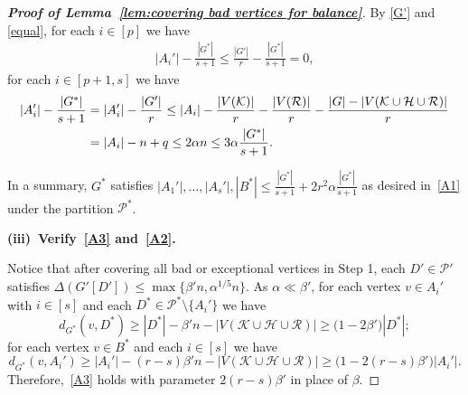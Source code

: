 \documentclass[11pt, a4paper]{article}
\theoremstyle{definition}
\newcommand{\be}{\beta}
\newcommand{\<}{\subseteq}
\newcommand{\De}{\Delta}
\begin{document}
\begin{proof}[{\bf Proof of Lemma~\ref{lem:covering bad vertices for balance}}]
By \eqref{G'} and \eqref{equal}, for each $i\in [p]$ we have 
\begin{align*}%
|A_i'|-\frac{|G^*|}{s+1}\leq \frac{|G'|}{r}- \frac{|G^*|}{s+1}=0,%
\end{align*}
for each $i\in [p+1,s]$  we have 
\begin{align}\notag
|A_i'|-\frac{|G^*|}{s+1}&=|A_i'|-\frac{|G'|}{r}\leq |A_i|-\frac{|V(\mathcal{K})|}{r}-\frac{|V(\mathcal{R})|}{r}-\frac{|G|-|V(\mathcal{K}\cup \mathcal{H}\cup \mathcal{R})|}{r}\\\notag
&=|A_i|-n+q\leq 2\alpha n\leq 3\alpha  \frac{|G^*|}{s+1}. 
\end{align}

In a summary, $G^*$ satisfies $|A_1'|,\ldots, |A_{s}'|,|B^*|\leq \frac{|G^*|}{s+1}+2r^2\alpha \frac{|G^*|}{s+1}$ as desired in~\ref{A1} under the partition $\mathcal{P}^*$.  %


\medskip



\medskip
\textbf{(iii)~Verify~\ref{A3} and~\ref{A2}.}\medskip

Notice that after covering all bad or exceptional vertices in Step 1, each $D'\in \mathcal{P}'$ satisfies $\De(G'[D'])\le \max\{\be' n, \alpha^{1/5}n\}$. 
{As $\alpha\ll\beta'$}, for each vertex $v\in A_i'$ with $i\in [s]$ and each $D^*\in \mathcal{P}^*\setminus \{A_i'\}$ we have 
$$
d_{G^*}(v,D^*)\geq |D^*|-\beta' n-|V(\mathcal{K}\cup \mathcal{H}\cup \mathcal{R})|\geq \big(1-2\beta'\big)|D^*|; 
$$
for each vertex $v\in B^*$ and each $i\in [s]$ we have 
$$
d_{G^*}(v,A_i')\geq |A_i'|-(r-s)\beta' n-|V(\mathcal{K}\cup \mathcal{H}\cup \mathcal{R})|\geq \big(1-2(r-s)\beta'\big)|A_i'|. 
$$
Therefore,~\ref{A3} holds with parameter $2(r-s)\beta'$ in place of $\beta$. 


\end{proof}
\end{document}
